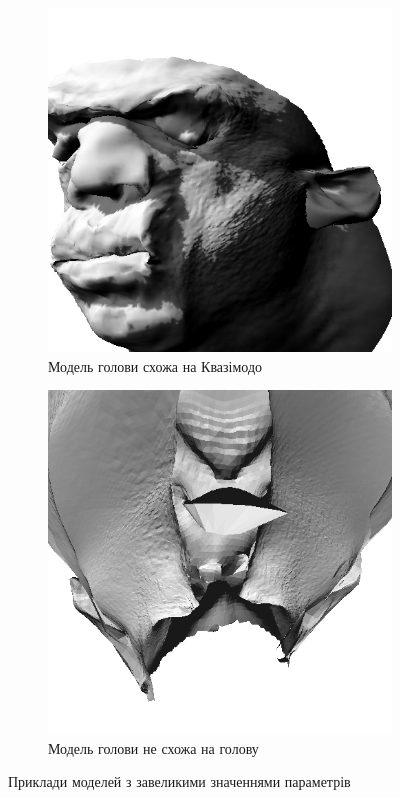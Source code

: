 \begin{figure}[h]
  \centering
  \begin{subfigure}[b]{0.4\textwidth}
    \centering
    \includegraphics[width=\textwidth]{images/notre-dame}
    \caption{Модель голови схожа на Квазімодо}
    \label{fig:interval:notre-dame}
  \end{subfigure}
  \begin{subfigure}[b]{0.4\textwidth}
    \centering
    \includegraphics[width=\textwidth]{images/non-human}
    \caption{Модель голови не схожа на голову}
    \label{fig:interval:non-human}
  \end{subfigure}
  \caption{Приклади моделей з завеликими значеннями параметрів}
\end{figure}


